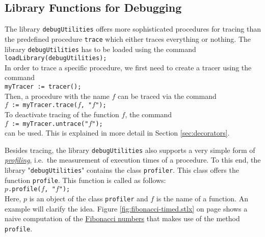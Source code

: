 \subsection{Library Functions for Debugging}
The library \texttt{debugUtilities} offers more sophisticated procedures for tracing than the
predefined procedure \texttt{trace} which either traces everything or nothing.  The library
\texttt{debugUtilities} has to be loaded using the command
\\[0.2cm]
\hspace*{1.3cm}
\texttt{loadLibrary(debugUtilities);}
\\[0.2cm]
In order to trace a specific procedure, we first need to create a tracer using the command
\\[0.2cm]
\hspace*{1.3cm}
\texttt{myTracer := tracer();}
\\[0.2cm]
Then, a procedure with the name $f$ can be traced via the command
\\[0.2cm]
\hspace*{1.3cm}
\texttt{$f$ := myTracer.trace($f$, "$f$");}
\\[0.2cm]
To deactivate tracing of the function $f$, the command
\\[0.2cm]
\hspace*{1.3cm}
\texttt{$f$ := myTracer.untrace("$f$");}
\\[0.2cm]
can be used.  This is explained in more detail in Section \ref{sec:decorators}. 

Besides tracing, the library \texttt{debugUtilities} also supports a very simple form of
\href{https://en.wikipedia.org/wiki/Profiling_(computer_programming)}{\emph{profiling}}, i.e.~the
measurement of execution times of a procedure.  To this end, the library "\texttt{debugUtilities}"
contains the class \texttt{profiler}.  This class offers the function \texttt{profile}.  This
function is called as follows:
\\[0.2cm]
\hspace*{1.3cm}
\texttt{$p$.profile($f$, "$f$");}
\\[0.2cm]
Here, $p$ is an object of the class \texttt{profiler} and $f$ is the name of a function.  An example
will clarify the idea.  Figure \ref{fig:fibonacci-timed.stlx} on page
\pageref{fig:fibonacci-timed.stlx} shows a naive computation of the 
\href{https://en.wikipedia.org/wiki/Fibonacci_number}{Fibonacci numbers} that makes use of the
method \texttt{profile}.

